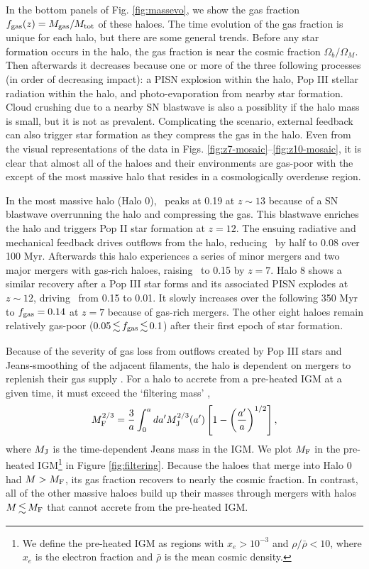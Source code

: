 \documentclass[useAMS,usenatbib]{mn2e}
\begin{document}
In the bottom panels of Fig. \ref{fig:massevo}, we show the gas
fraction $f_{\rm gas}(z) = M_{\rm gas} / M_{\rm tot}$ of these haloes.
The time evolution of the gas fraction is unique for each halo, but
there are some general trends.  Before any star formation occurs in
the halo, the gas fraction is near the cosmic fraction $\Omega_b /
\Omega_M$.  Then afterwards it decreases because one or more of the
three following processes (in order of decreasing impact): a PISN
explosion within the halo, Pop III stellar radiation within the halo,
and photo-evaporation from nearby star formation.  Cloud crushing due
to a nearby SN blastwave is also a possiblity if the halo mass is
small, but it is not as prevalent.  Complicating the scenario,
external feedback can also trigger star formation as they compress the
gas in the halo.  Even from the visual representations of the data in
Figs. \ref{fig:z7-mosaic}--\ref{fig:z10-mosaic}, it is clear that
almost all of the haloes and their environments are gas-poor with the
except of the most massive halo that resides in a cosmologically
overdense region.

In the most massive halo (Halo 0), \fgas~peaks at 0.19 at $z \sim 13$
because of a SN blastwave overrunning the halo and compressing the
gas.  This blastwave enriches the halo and triggers Pop II star
formation at $z=12$.  The ensuing radiative and mechanical feedback
drives outflows from the halo, reducing \fgas~by half to 0.08 over 100
Myr.  Afterwards this halo experiences a series of minor mergers and
two major mergers with gas-rich haloes, raising \fgas~to 0.15 by
$z=7$.  Halo 8 shows a similar recovery after a Pop III star forms and
its associated PISN explodes at $z \sim 12$, driving \fgas~from 0.15
to 0.01.  It slowly increases over the following 350 Myr to $\fgas =
0.14$ at $z=7$ because of gas-rich mergers.  The other eight haloes
remain relatively gas-poor ($0.05 \la \fgas \la 0.1$) after their
first epoch of star formation.

Because of the severity of gas loss from outflows created by Pop III
stars and Jeans-smoothing of the adjacent filaments, the halo is
dependent on mergers to replenish their gas supply
\citep[cf.][]{Yoshida07, Wise08_Gal, Greif10}.  For a halo to accrete
from a pre-heated IGM at a given time, it must exceed the `filtering
mass' \citep{Hui98, Gnedin00},
%
\begin{equation}
  \label{eqn:filtering}
  M_{\rm F}^{2/3} = \frac{3}{a} \int^a_0 da^\prime M_{\rm J}^{2/3}(a^\prime)
  \left[ 1 - \left(\frac{a^\prime}{a}\right)^{1/2} \right],
\end{equation}
where $M_{\rm J}$ is the time-dependent Jeans mass in the IGM.  We
plot $M_{\rm F}$ in the pre-heated IGM\footnote{We define the
  pre-heated IGM as regions with $x_e > 10^{-3}$ and $\rho/\bar{\rho}
  < 10$, where $x_e$ is the electron fraction and $\bar{\rho}$ is the
  mean cosmic density.} in Figure \ref{fig:filtering}.  Because the
haloes that merge into Halo 0 had $M > M_{\rm F}$, its gas fraction
recovers to nearly the cosmic fraction.  In contrast, all of the other
massive haloes build up their masses through mergers with halos $M \la
M_{\rm F}$ that cannot accrete from the pre-heated IGM.
\end{document}
